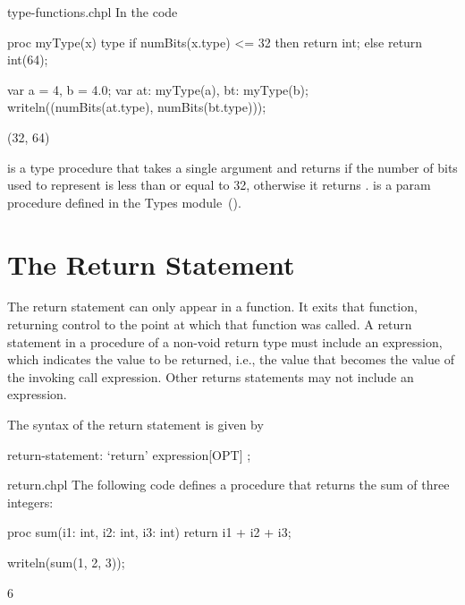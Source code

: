\begin{chapelexample}{type-functions.chpl}
In the code
\begin{chapel}
proc myType(x) type {
  if numBits(x.type) <= 32 then return int;
  else return int(64);
}
\end{chapel}
\begin{chapelpost}
var a = 4,
    b = 4.0;
var at: myType(a),
    bt: myType(b);
writeln((numBits(at.type), numBits(bt.type)));
\end{chapelpost}
\begin{chapeloutput}
(32, 64)
\end{chapeloutput}
 is a type procedure that takes a single
argument  and returns  if the number of bits used to
represent  is less than or equal to 32, otherwise it
returns .   is a param
procedure defined in the Types module~().
\end{chapelexample}


\section{The Return Statement}
\label{The_Return_Statement}

The return statement can only appear in a function.  It exits that
function, returning control to the point at which that function was
called.  A return statement in a procedure of a non-void return type
must include an expression, which indicates the value to be returned,
i.e., the value that becomes the value of the invoking call expression.
Other returns statements may not include an expression.

The syntax of the return statement is given by
\begin{syntax}
return-statement:
  `return' expression[OPT] ;
\end{syntax}

\begin{chapelexample}{return.chpl}
The following code defines a procedure that returns the sum of three
integers:
\begin{chapel}
proc sum(i1: int, i2: int, i3: int)
  return i1 + i2 + i3;
\end{chapel}
\begin{chapelpost}
writeln(sum(1, 2, 3));
\end{chapelpost}
\begin{chapeloutput}
6
\end{chapeloutput}
\end{chapelexample}


